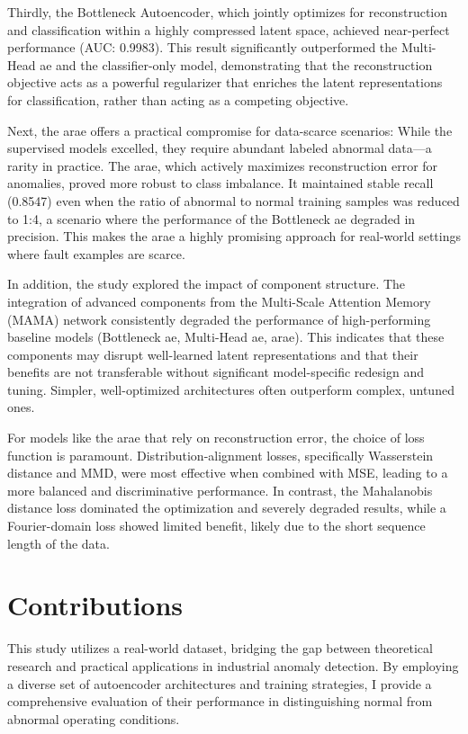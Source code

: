Thirdly, the Bottleneck Autoencoder, which jointly optimizes for reconstruction and classification within a highly compressed latent space, achieved near-perfect performance (AUC: 0.9983).
This result significantly outperformed the Multi-Head \gls{ae} and the classifier-only model, demonstrating that the reconstruction objective acts as a powerful regularizer that enriches the latent representations for classification, rather than acting as a competing objective.

Next, the \gls{arae} offers a practical compromise for data-scarce scenarios: While the supervised models excelled, they require abundant labeled abnormal data—a rarity in practice.
The \gls{arae}, which actively maximizes reconstruction error for anomalies, proved more robust to class imbalance.
It maintained stable recall (0.8547) even when the ratio of abnormal to normal training samples was reduced to 1:4, a scenario where the performance of the Bottleneck \gls{ae} degraded in precision.
This makes the \gls{arae} a highly promising approach for real-world settings where fault examples are scarce.

In addition, the study explored the impact of component structure.
The integration of advanced components from the Multi-Scale Attention Memory (MAMA) network consistently degraded the performance of high-performing baseline models (Bottleneck \gls{ae}, Multi-Head \gls{ae}, \gls{arae}).
This indicates that these components may disrupt well-learned latent representations and that their benefits are not transferable without significant model-specific redesign and tuning.
Simpler, well-optimized architectures often outperform complex, untuned ones.

For models like the \gls{arae} that rely on reconstruction error, the choice of loss function is paramount.
Distribution-alignment losses, specifically Wasserstein distance and MMD, were most effective when combined with MSE, leading to a more balanced and discriminative performance.
In contrast, the Mahalanobis distance loss dominated the optimization and severely degraded results, while a Fourier-domain loss showed limited benefit, likely due to the short sequence length of the data.


\section{Contributions}
This study utilizes a real-world dataset, bridging the gap between theoretical research and practical applications in industrial anomaly detection.
By employing a diverse set of autoencoder architectures and training strategies, I provide a comprehensive evaluation of their performance in distinguishing normal from abnormal operating conditions. 


